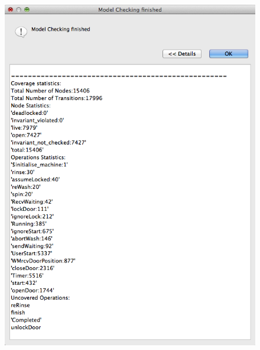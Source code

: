  \begin{figure}[!htbp]
  \centering
  \ifplastex
  \includegraphics[width=1024]{figures/image34.png}
  \else

\end{figure}
